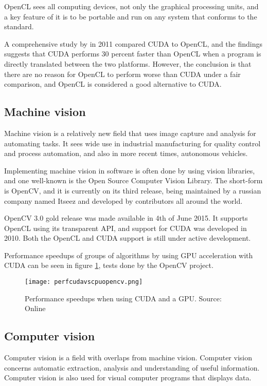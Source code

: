 OpenCL sees all computing devices, not only the graphical processing units, and a key feature of it is to be portable and run on any system that conforms to the standard.

A comprehensive study by \citep{fang11} in 2011 compared CUDA to OpenCL, and the findings suggests that CUDA performs 30 percent faster than OpenCL when a program is directly translated between the two platforms. However, the conclusion is that there are no reason for OpenCL to perform worse than CUDA under a fair comparison, and OpenCL is considered a good alternative to CUDA.

\subsection{Machine vision}
Machine vision is a relatively new field that uses image capture and analysis for automating tasks. It sees wide use in industrial manufacturing for quality control and process automation, and also in more recent times, autonomous vehicles.

Implementing machine vision in software is often done by using vision libraries, and one well-known is the Open Source Computer Vision Library. The short-form is OpenCV, and it is currently on its third release, being maintained by a russian company named Itseez and developed by contributors all around the world.

OpenCV 3.0 gold release was made available in 4th of June 2015. It supports OpenCL using its transparent API, and support for CUDA was developed in 2010. Both the OpenCL and CUDA support is still under active development.

Performance speedups of groups of algorithms by using GPU acceleration with CUDA can be seen in figure \ref{fig:perfcudavscpuopencv}, tests done by the OpenCV project.

\begin{figure}[ht]
    \centering
    \texttt{[image: perfcudavscpuopencv.png]}
    \caption{Performance speedups when using CUDA and a GPU. Source: Online \citet{opencvcuda15}}
    \label{fig:perfcudavscpuopencv}
\end{figure}
\FloatBarrier

\subsection{Computer vision}
Computer vision is a field with overlaps from machine vision. Computer vision concerns automatic extraction, analysis and understanding of useful information. Computer vision is also used for visual computer programs that displays data.

